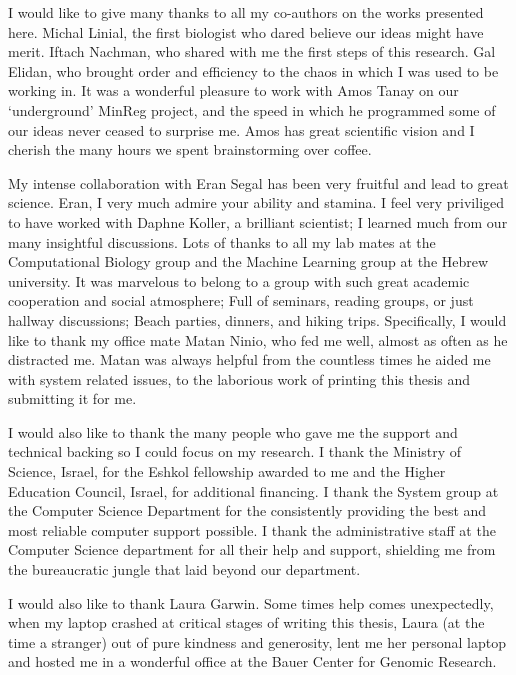 \begin{acknowledgements}
I would like to give many thanks to all my co-authors on the works presented here. Michal Linial, the first biologist who dared believe our ideas might have merit. Iftach Nachman, who shared with me the first steps of this research. Gal Elidan, who brought order and efficiency to the chaos in which I was used to be working in. It was a wonderful pleasure to work with Amos Tanay on our ‘underground’ MinReg project, and the speed in which he programmed some of our ideas never ceased to surprise me. Amos has great scientific vision and I cherish the many hours we spent brainstorming over coffee.

My intense collaboration with Eran Segal has been very fruitful and lead to great science. Eran, I very much admire your ability and stamina. I feel very priviliged to have worked with Daphne Koller, a brilliant scientist; I learned much from our many insightful discussions. Lots of thanks to all my lab mates at the Computational Biology group and the Machine Learning group at the Hebrew university. It was marvelous to belong to a group with such great academic cooperation and social atmosphere; Full of seminars, reading groups, or just hallway discussions; Beach parties, dinners, and hiking trips. Specifically, I would like to thank my office mate Matan Ninio, who fed me well, almost as often as he distracted me. Matan was always helpful from the countless times he aided me with system related issues, to the laborious work of printing this thesis and submitting it for me.

I would also like to thank the many people who gave me the support and technical backing so I could focus on my research. I thank the Ministry of Science, Israel, for the Eshkol fellowship awarded to me and the Higher Education Council, Israel, for additional financing. I thank the System
group at the Computer Science Department for the consistently providing the best and most reliable computer support possible. I thank the administrative staff at the Computer Science department for all their help and support, shielding me from the bureaucratic jungle that laid beyond our department. 

I would also like to thank Laura Garwin. Some times help comes unexpectedly, when my laptop crashed at critical stages of writing this thesis, Laura (at the time a stranger) out of pure kindness and generosity, lent me her personal laptop and hosted me in a wonderful office at the Bauer Center for Genomic Research.


\end{acknowledgements}
